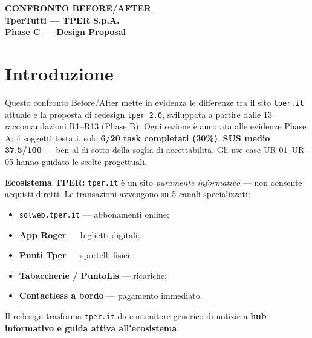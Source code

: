 ﻿
\begin{tcolorbox}[colback=primaryColor,colframe=primaryColor,arc=3mm,halign=center,valign=center,height=2.5cm]
    \color{white}\LARGE\bfseries CONFRONTO BEFORE/AFTER \\[0.2cm]
    \color{white!80}\large TperTutti --- TPER S.p.A. \\[0.1cm]
    \color{white!60}\normalsize Phase C --- Design Proposal
\end{tcolorbox}

\vspace{0.5cm}

\section{Introduzione}

Questo confronto Before/After mette in evidenza le differenze tra il sito \texttt{tper.it} attuale e la proposta di redesign \texttt{tper 2.0}, sviluppata a partire dalle 13 raccomandazioni R1--R13 (Phase B). Ogni sezione è ancorata alle evidenze Phase A: 4 soggetti testati, solo \textbf{6/20 task completati (30\%)}, \textbf{SUS medio 37.5/100} --- ben al di sotto della soglia di accettabilità. Gli use case UR-01--UR-05 hanno guidato le scelte progettuali.

\vspace{0.2cm}

\textbf{Ecosistema TPER:} \texttt{tper.it} è un sito \textit{puramente informativo} --- non consente acquisti diretti. Le transazioni avvengono su 5 canali specializzati:
\begin{itemize}[nosep]
    \item \texttt{solweb.tper.it} --- abbonamenti online;
    \item \textbf{App Roger} --- biglietti digitali;
    \item \textbf{Punti Tper} --- sportelli fisici;
    \item \textbf{Tabaccherie / PuntoLis} --- ricariche;
    \item \textbf{Contactless a bordo} --- pagamento immediato.
\end{itemize}
Il redesign trasforma \texttt{tper.it} da contenitore generico di notizie a \textbf{hub informativo e guida attiva all'ecosistema}.

\vspace{0.3cm}

